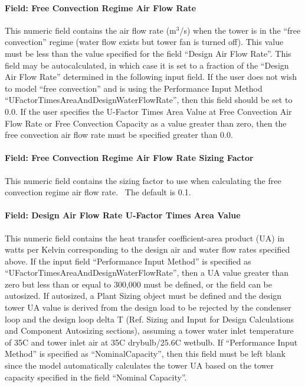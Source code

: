 \paragraph{Field: Free Convection Regime Air Flow Rate}\label{field-free-convection-regime-air-flow-rate-1}

This numeric field contains the air flow rate (m\(^{3}\)/s) when the tower is in the ``free convection'' regime (water flow exists but tower fan is turned off). This value must be less than the value specified for the field ``Design Air Flow Rate''. This field may be autocalculated, in which case it is set to a fraction of the ``Design Air Flow Rate'' determined in the following input field. If the user does not wish to model ``free convection'' and is using the Performance Input Method ``UFactorTimesAreaAndDesignWaterFlowRate'', then this field should be set to 0.0. If the user specifies the U-Factor Times Area Value at Free Convection Air Flow Rate or Free Convection Capacity as a value greater than zero, then the free convection air flow rate must be specified greater than 0.0.

\paragraph{Field: Free Convection Regime Air Flow Rate Sizing Factor}\label{field-free-convection-regime-air-flow-rate-sizing-factor-1}

This numeric field contains the sizing factor to use when calculating the free convection regime air flow rate.~ The default is 0.1.

\paragraph{Field: Design Air Flow Rate U-Factor Times Area Value}\label{field-design-air-flow-rate-u-factor-times-area-value}

This numeric field contains the heat transfer coefficient-area product (UA) in watts per Kelvin corresponding to the design air and water flow rates specified above. If the input field ``Performance Input Method'' is specified as ``UFactorTimesAreaAndDesignWaterFlowRate'', then a UA value greater than zero but less than or equal to 300,000 must be defined, or the field can be autosized. If autosized, a Plant Sizing object must be defined and the design tower UA value is derived from the design load to be rejected by the condenser loop and the design loop delta T (Ref. Sizing and Input for Design Calculations and Component Autosizing sections), assuming a tower water inlet temperature of 35C and tower inlet air at 35C drybulb/25.6C wetbulb. If ``Performance Input Method'' is specified as ``NominalCapacity'', then this field must be left blank since the model automatically calculates the tower UA based on the tower capacity specified in the field ``Nominal Capacity''.


